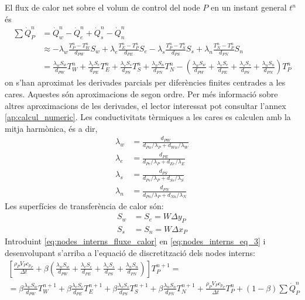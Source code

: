 \noindent
El flux de calor net sobre el volum de control del node $P$ en un instant general $t^{n}$ és
\begin{align}
	\sum \dot{Q}_P^n 
	&= 
	\dot{Q}_w^n - \dot{Q}_e^n + \dot{Q}_s^n - \dot{Q}_n^n \nonumber \\
	&\approx 
	- \lambda_w \frac{T_P^n - T_W^n}{d_{PW}} S_w 
	+ \lambda_e \frac{T_E^n - T_P^n}{d_{PE}} S_e
	- \lambda_s \frac{T_P^n - T_S^n}{d_{PS}} S_s 
	+ \lambda_n \frac{T_N^n - T_P^n}{d_{PN}} S_n \nonumber \\
	&=
	\frac{\lambda_w S_w}{d_{PW}} T_W^n + 
	\frac{\lambda_e S_e}{d_{PE}} T_E^n + 
	\frac{\lambda_s S_s}{d_{PS}} T_S^n + 
	\frac{\lambda_n S_n}{d_{PN}} T_N^n -
	\left(
	\frac{\lambda_w S_w}{d_{PW}} + 
	\frac{\lambda_e S_e}{d_{PE}} + 
	\frac{\lambda_s S_s}{d_{PS}} + 
	\frac{\lambda_n S_n}{d_{PN}}
	\right) T_P^n \label{eq:nodes_interns_fluxe_calor}
\end{align}
on s'han aproximat les derivades parcials per diferències finites centrades a les cares. Aquestes són aproximacions de segon ordre. Per més informació sobre altres aproximacions de les derivades, el lector interessat pot consultar l'annex \ref{ap:calcul_numeric}. Les conductivitats tèrmiques a les cares es calculen amb la mitja harmònica, és a dir,
\begin{align}
	\lambda_w &= \frac{d_{PW}}{d_{Pw} / \lambda_P + d_{Ww} / \lambda_W} \\
	\lambda_e &= \frac{d_{PE}}{d_{Pe} / \lambda_P + d_{Ee} / \lambda_E} \\
	\lambda_s &= \frac{d_{PS}}{d_{Ps} / \lambda_P + d_{Ss} / \lambda_S} \\
	\lambda_n &= \frac{d_{PN}}{d_{Pn} / \lambda_P + d_{Nn} / \lambda_N}
\end{align}
Les superfícies de transferència de calor són:
\begin{align}
	S_w &= S_e = W \Delta y_P \\
	S_s &= S_n = W \Delta x_P 
\end{align}
Introduint \eqref{eq:nodes_interns_fluxe_calor} en \eqref{eq:nodes_interns_eq_3} i desenvolupant s'arriba a l'equació de discretització dels nodes interns:
\begin{multline} \label{eq:equacio_discretitzacio_nodes_interns}
	\left[
		\frac{\rho_P V_P c_{p_P}}{\Delta t} + 
		\beta \left(
		\frac{\lambda_w S_w}{d_{PW}} + 
		\frac{\lambda_e S_e}{d_{PE}} + 
		\frac{\lambda_s S_s}{d_{PS}} + 
		\frac{\lambda_n S_n}{d_{PN}}
		\right)
	\right] T_P^{n+1} = \\
	=
	\beta \frac{\lambda_w S_w}{d_{PW}} T_W^{n+1} + 
	\beta \frac{\lambda_e S_e}{d_{PE}} T_E^{n+1} + 
	\beta \frac{\lambda_s S_s}{d_{PS}} T_S^{n+1} + 
	\beta \frac{\lambda_n S_n}{d_{PN}} T_N^{n+1} + 
	\frac{\rho_P V_P c_{p_P}}{\Delta t} T_P^n + 
	(1 - \beta) \sum \dot{Q}_P^n	
\end{multline}
